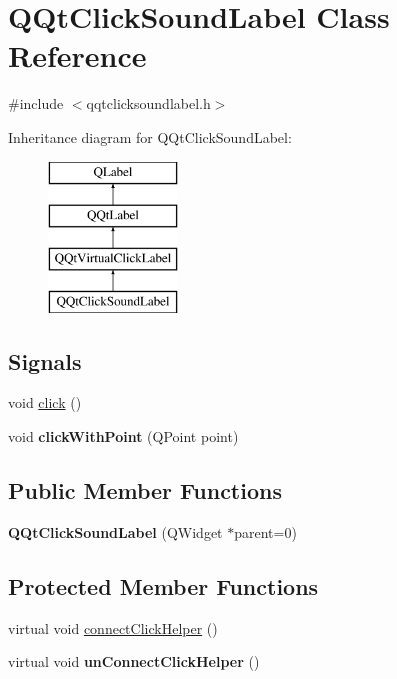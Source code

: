 \hypertarget{class_q_qt_click_sound_label}{}\section{Q\+Qt\+Click\+Sound\+Label Class Reference}
\label{class_q_qt_click_sound_label}


{\ttfamily \#include $<$qqtclicksoundlabel.\+h$>$}

Inheritance diagram for Q\+Qt\+Click\+Sound\+Label\+:\begin{figure}[H]
\begin{center}
\leavevmode
\includegraphics[height=4.000000cm]{class_q_qt_click_sound_label}
\end{center}
\end{figure}
\subsection*{Signals}
\begin{DoxyCompactItemize}
\item 
void \mbox{\hyperlink{class_q_qt_click_sound_label_a3e84481bb9531481ff9c1f6ec9d9246f}{click}} ()
\item 
\mbox{\label{class_q_qt_click_sound_label_ae17f239a0e8b5a27c6036814b4c5a2a0}} 
void {\bfseries click\+With\+Point} (Q\+Point point)
\end{DoxyCompactItemize}
\subsection*{Public Member Functions}
\begin{DoxyCompactItemize}
\item 
\mbox{\label{class_q_qt_click_sound_label_a450a86809da730cc004e8c75a4f475f0}} 
{\bfseries Q\+Qt\+Click\+Sound\+Label} (Q\+Widget $\ast$parent=0)
\end{DoxyCompactItemize}
\subsection*{Protected Member Functions}
\begin{DoxyCompactItemize}
\item 
virtual void \mbox{\hyperlink{class_q_qt_click_sound_label_a2153c2a44777f2f3a4f22daee2872915}{connect\+Click\+Helper}} ()
\item 
\mbox{\label{class_q_qt_click_sound_label_a26007060d817c922079a9161d9df2737}} 
virtual void {\bfseries un\+Connect\+Click\+Helper} ()
\end{DoxyCompactItemize}
